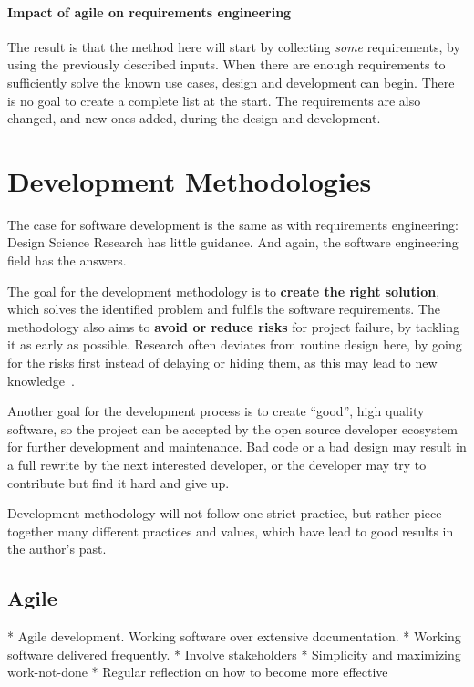 \paragraph{Impact of agile on requirements engineering}
The result is that the method here will start by collecting \textit{some} requirements, by using the previously described inputs.
When there are enough requirements to sufficiently solve the known use cases, design and development can begin.
There is no goal to create a complete list at the start.
The requirements are also changed, and new ones added, during the design and development.


\section{Development Methodologies}

The case for software development is the same as with requirements engineering: Design Science Research has little guidance.
And again, the software engineering field has the answers.


The goal for the development methodology is to \textbf{create the right solution}, which solves the identified problem and fulfils the software requirements.
The methodology also aims to \textbf{avoid or reduce risks} for project failure, by tackling it as early as possible.
Research often deviates from routine design here, by going for the risks first instead of delaying or hiding them, as this may lead to new knowledge~\cite[p.~114]{oatesResearchingInformationSystems2006}.


Another goal for the development process is to create ``good'', high quality software, so the project can be accepted by the \gls{open source} developer ecosystem for further development and maintenance.
Bad code or a bad design may result in a full rewrite by the next interested developer, or the developer may try to contribute but find it hard and give up.


Development methodology will not follow one strict practice, but rather piece together many different practices and values, which have lead to good results in the author's past.


\subsection{Agile}

* Agile development. Working software over extensive documentation.
* Working software delivered frequently.
* Involve stakeholders
* Simplicity and maximizing work-not-done 
* Regular reflection on how to become more effective

